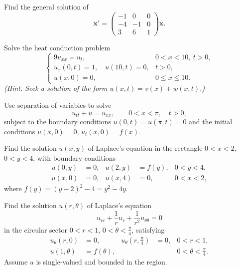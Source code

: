 \documentclass[11pt,oneside]{article}
\begin{document}
\begin{problem}
Find the general solution of
\[
\mathbf x'=\begin{pmatrix}-1&0&0\\-4&-1&0\\3&6&1\end{pmatrix}\mathbf x.
\]
\end{problem}

\begin{problem}
Solve the heat conduction problem
\[
\begin{cases}
9u_{xx}=u_t,&0<x<10,\ t>0,\\
u_x(0,t)=1,\quad u(10,t)=0,&t>0,\\
u(x,0)=0,&0\le x\le10.
\end{cases}
\]
\textit{(Hint. Seek a solution of the form $u(x,t)=v(x)+w(x,t)$.)}
\end{problem}

\begin{problem}
Use separation of variables to solve
\[
u_{tt}+u=u_{xx},\qquad 0<x<\pi,\quad t>0,
\]
subject to the boundary conditions $u(0,t)=u(\pi,t)=0$ and the initial conditions $u(x,0)=0$, $u_t(x,0)=f(x)$.
\end{problem}

\begin{problem}
Find the solution $u(x,y)$ of Laplace's equation in the rectangle $0<x<2$, $0<y<4$, with boundary conditions
\[
\begin{aligned}
u(0,y)&=0,&u(2,y)&=f(y),&0<y<4,\\
u(x,0)&=0,&u(x,4)&=0,&0<x<2,
\end{aligned}
\]
where $f(y)=(y-2)^2-4=y^2-4y$.
\end{problem}

\begin{problem}
Find the solution $u(r,\theta)$ of Laplace's equation
\[
u_{rr}+\frac1r u_r+\frac1{r^2}u_{\theta\theta}=0
\]
in the circular sector $0<r<1$, $0<\theta<\frac\pi4$, satisfying
\[
\begin{aligned}
u_\theta(r,0)&=0,&u_\theta\left(r,\frac\pi4\right)&=0,&0<r<1,\\
u(1,\theta)&=f(\theta),&&&0<\theta<\frac\pi4.
\end{aligned}
\]
Assume $u$ is single-valued and bounded in the region.
\end{problem}
\end{document}
